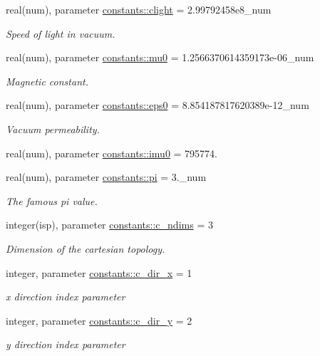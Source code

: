 \begin{DoxyCompactItemize}
real(num), parameter \hyperlink{namespaceconstants_ac23d8857383002cada2aa571fd859533}{constants\+::clight} = 2.\+99792458e8\+\_\+num
\begin{DoxyCompactList}\small\item\em Speed of light in vacuum. \end{DoxyCompactList}\item 
real(num), parameter \hyperlink{namespaceconstants_adf2453bfeefbefa1135a81f4ddfe4d6d}{constants\+::mu0} = 1.\+2566370614359173e-\/06\+\_\+num
\begin{DoxyCompactList}\small\item\em Magnetic constant. \end{DoxyCompactList}\item 
real(num), parameter \hyperlink{namespaceconstants_a4fc609b4d7bd5d8e45e57bd0ba7c5e29}{constants\+::eps0} = 8.\+854187817620389e-\/12\+\_\+num
\begin{DoxyCompactList}\small\item\em Vacuum permeability. \end{DoxyCompactList}\item 
real(num), parameter \hyperlink{namespaceconstants_abcf10ccefe6023e0401ce1b4a5f74fb5}{constants\+::imu0} = 795774.
\item 
real(num), parameter \hyperlink{namespaceconstants_a736c2860cb0585043ad4abcd1c3352b1}{constants\+::pi} = 3.\+\_\+num
\begin{DoxyCompactList}\small\item\em The famous pi value. \end{DoxyCompactList}\item 
integer(isp), parameter \hyperlink{namespaceconstants_aad8d45b739c41f2926fd2accb3de9dd2}{constants\+::c\+\_\+ndims} = 3
\begin{DoxyCompactList}\small\item\em Dimension of the cartesian topology. \end{DoxyCompactList}\item 
integer, parameter \hyperlink{namespaceconstants_a8e38e74e9723ce351e7a20787e649e89}{constants\+::c\+\_\+dir\+\_\+x} = 1
\begin{DoxyCompactList}\small\item\em x direction index parameter \end{DoxyCompactList}\item 
integer, parameter \hyperlink{namespaceconstants_a5d84bc6ed2e3bd7b6e64704dc587825b}{constants\+::c\+\_\+dir\+\_\+y} = 2
\begin{DoxyCompactList}\small\item\em y direction index parameter \end{DoxyCompactList}\item 

\end{DoxyCompactItemize}
